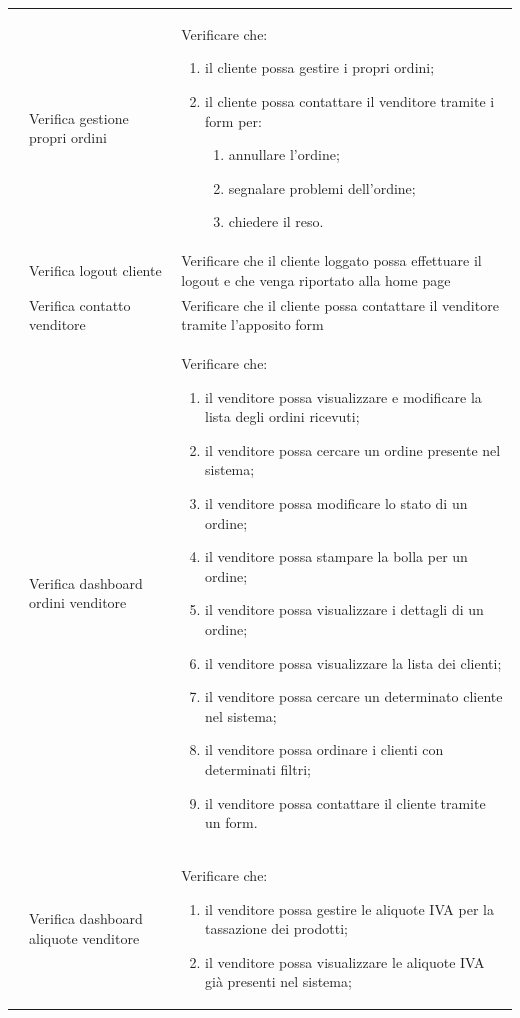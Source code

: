 \begin{center}
\begin{longtable}{|p{1cm}|p{4.85cm}|p{9cm}|}
	 & Verifica gestione propri ordini & Verificare che:
	\begin{enumerate}
		\item il cliente possa gestire i propri ordini;
		\item il cliente possa contattare il venditore tramite i form per:
		\begin{enumerate}
			\item annullare l'ordine;
			\item segnalare problemi dell'ordine;
			\item chiedere il reso.
		\end{enumerate}
	\end{enumerate} \\
	 & Verifica logout cliente & Verificare che il cliente loggato possa effettuare il logout e che venga riportato alla home page \\
	 & Verifica contatto venditore & Verificare che il cliente possa contattare il venditore tramite l'apposito form  \\
	 & Verifica dashboard ordini venditore & Verificare che:
	\begin{enumerate}
		\item il venditore possa visualizzare e modificare la lista degli ordini ricevuti;
		\item il venditore possa cercare un ordine presente nel sistema;
		\item il venditore possa modificare lo stato di un ordine;
		\item il venditore possa stampare la bolla per un ordine;
		\item il venditore possa visualizzare i dettagli di un ordine;
		\item il venditore possa visualizzare la lista dei clienti;
		\item il venditore possa cercare un determinato cliente nel sistema;
		\item il venditore possa ordinare i clienti con determinati filtri;
		\item il venditore possa contattare il cliente tramite un form.
	\end{enumerate} \\
	 & Verifica dashboard aliquote venditore & Verificare che:
	\begin{enumerate}
		\item il venditore possa gestire le aliquote IVA per la tassazione dei prodotti;
		\item il venditore possa visualizzare le aliquote IVA già presenti nel sistema;

\end{enumerate}
\end{longtable}
\end{center}
